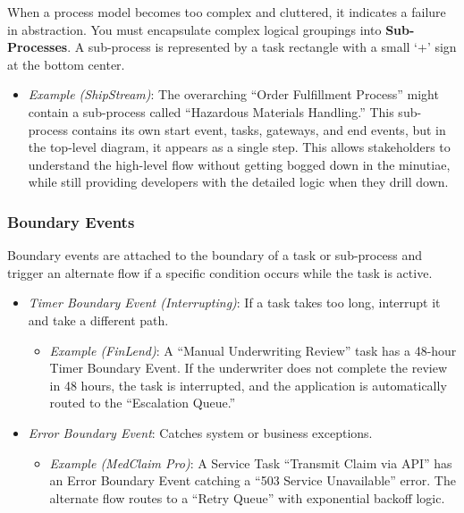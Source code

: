 When a process model becomes too complex and cluttered, it indicates a
failure in abstraction. You must encapsulate complex logical groupings
into \textbf{Sub-Processes}. A sub-process is represented by a task
rectangle with a small `+' sign at the bottom center.

\begin{itemize}
\tightlist
\item
  \emph{Example (ShipStream)}: The overarching ``Order Fulfillment
  Process'' might contain a sub-process called ``Hazardous Materials
  Handling.'' This sub-process contains its own start event, tasks,
  gateways, and end events, but in the top-level diagram, it appears as
  a single step. This allows stakeholders to understand the high-level
  flow without getting bogged down in the minutiae, while still
  providing developers with the detailed logic when they drill down.
\end{itemize}

\subsubsection{Boundary Events}\label{boundary-events}

Boundary events are attached to the boundary of a task or sub-process
and trigger an alternate flow if a specific condition occurs while the
task is active.

\begin{itemize}
\tightlist
\item
  \emph{Timer Boundary Event (Interrupting)}: If a task takes too long,
  interrupt it and take a different path.

  \begin{itemize}
  \tightlist
  \item
    \emph{Example (FinLend)}: A ``Manual Underwriting Review'' task has
    a 48-hour Timer Boundary Event. If the underwriter does not complete
    the review in 48 hours, the task is interrupted, and the application
    is automatically routed to the ``Escalation Queue.''
  \end{itemize}
\item
  \emph{Error Boundary Event}: Catches system or business exceptions.

  \begin{itemize}
  \tightlist
  \item
    \emph{Example (MedClaim Pro)}: A Service Task ``Transmit Claim via
    API'' has an Error Boundary Event catching a ``503 Service
    Unavailable'' error. The alternate flow routes to a ``Retry Queue''
    with exponential backoff logic.
  \end{itemize}
\end{itemize}

